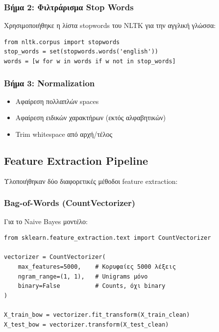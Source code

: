 \documentclass[12pt,a4paper,twoside]{book}
\begin{document}
\subsubsection{Βήμα 2: Φιλτράρισμα Stop Words}

Χρησιμοποιήθηκε η λίστα stopwords του NLTK για την αγγλική γλώσσα:

\begin{tcolorbox}[myCustomStyle={Stopwords Filtering}]
    \begin{lstlisting}[style=myPythonStyle]
from nltk.corpus import stopwords
stop_words = set(stopwords.words('english'))
words = [w for w in words if w not in stop_words]
\end{lstlisting}
\end{tcolorbox}

\subsubsection{Βήμα 3: Normalization}

\begin{itemize}
    \item Αφαίρεση πολλαπλών spaces
    \item Αφαίρεση ειδικών χαρακτήρων (εκτός αλφαβητικών)
    \item Trim whitespace από αρχή/τέλος
\end{itemize}

\subsection{Feature Extraction Pipeline}

Υλοποιήθηκαν δύο διαφορετικές μέθοδοι feature extraction:

\subsubsection{Bag-of-Words (CountVectorizer)}

Για το Naive Bayes μοντέλο:

\begin{tcolorbox}[myCustomStyle={Bag-of-Words with CountVectorizer}]
    \begin{lstlisting}[style=myPythonStyle]
from sklearn.feature_extraction.text import CountVectorizer

vectorizer = CountVectorizer(
    max_features=5000,    # Κορυφαίες 5000 λέξεις
    ngram_range=(1, 1),   # Unigrams μόνο
    binary=False          # Counts, όχι binary
)

X_train_bow = vectorizer.fit_transform(X_train_clean)
X_test_bow = vectorizer.transform(X_test_clean)
\end{lstlisting}
\end{tcolorbox}
\end{document}

